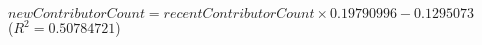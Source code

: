 $\mathit{newContributorCount} = \mathit{recentContributorCount} \times 0.19790996 - 0.1295073$\\($R^2 = 0.50784721$)